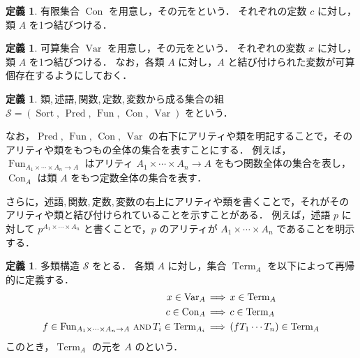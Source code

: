 \documentclass[./main]{subfiles}
\newcommand{\op}[1]{\mathop{\mathrm{#1}}\nolimits}
\newcommand{\textem}[1]{\textbf{\textgt{#1}}}
\newcommand{\mathscr}[1]{\mathcal{#1}}
\newcommand{\fl}[1]{}
\newcommand{\fcdots}{\mathord{\cdots}}
\newcommand{\ats}{\,}
\newcommand{\fwland}{\,\mathbin{\text{\textsc{and}}}\,}
\newcommand{\fLongrightarrow}{\,\Longrightarrow\,}
\theoremstyle{definition}
\newtheorem{defi}[theo]{定義}
\begin{document}
\begin{defi}
有限集合 $ \op{Con} $ を用意し，その元を\textem{定数\fl{constant}}という．
それぞれの定数 $ c $ に対し，類 $ A $ を1つ結びつける．
\end{defi}

\begin{defi}
可算集合 $ \op{Var} $ を用意し，その元を\textem{変数\fl{variable}}という．
それぞれの変数 $ x $ に対し，類 $ A $ を1つ結びつける．
なお，各類 $ A $ に対し，$ A $ と結び付けられた変数が可算個存在するようにしておく．
\end{defi}

\begin{defi}
類,\ats{}述語,\ats{}関数,\ats{}定数,\ats{}変数から成る集合の組 $ \mathscr{S} = (\op{Sort},\ats \op{Pred},\ats \op{Fun},\ats \op{Con},\ats \op{Var}) $ を\textem{多類構造\fl{many sorted structure}}という．
\end{defi}

なお，$ \op{Pred},\ats \op{Fun},\ats \op{Con},\ats \op{Var} $ の右下にアリティや類を明記することで，そのアリティや類をもつもの全体の集合を表すことにする．
例えば，$ \op{Fun} _{ A _1 \times \fcdots \times A _n \to A} $ はアリティ $  A _1 \times \fcdots \times A _n \to A $ をもつ関数全体の集合を表し，$ \op{Con} _A $ は類 $ A $ をもつ定数全体の集合を表す．

さらに，述語,\ats{}関数,\ats{}定数,\ats{}変数の右上にアリティや類を書くことで，それがそのアリティや類と結び付けられていることを示すことがある．
例えば，述語 $ p $ に対して $ p ^{A _1 \times \fcdots \times A _n} $ と書くことで，$ p $ のアリティが $ A _1 \times \fcdots \times A _n $ であることを明示する．

\begin{defi}
多類構造 $ \mathscr{S} $ をとる．
各類 $ A $ に対し，集合 $ \op{Term} _A $ を以下によって再帰的に定義する．
\begin{align*}
x \in \op{Var} _A & \fLongrightarrow x \in \op{Term} _A \\
c \in \op{Con} _A & \fLongrightarrow c \in \op{Term} _A \\
f \in \op{Fun} _{A _1 \times \cdots \times A _n \to A} \fwland T _i \in \op{Term} _{A _i} & \fLongrightarrow (f T _1 \cdots T _n) \in \op{Term} _A
\end{align*}
このとき，$ \op{Term} _A $ の元を $ A $ の\textem{論理項\fl{term}}という．
\end{defi}
\end{document}
